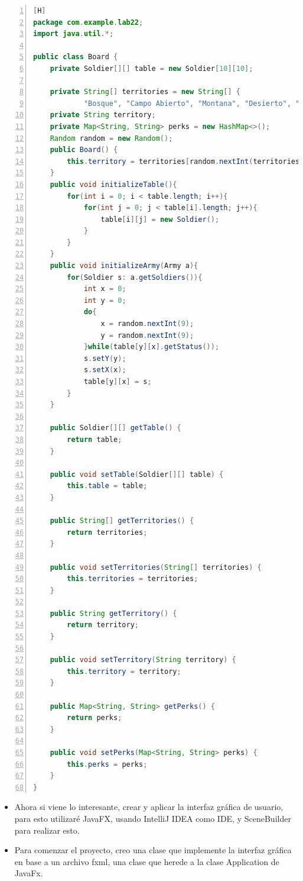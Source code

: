 \documentclass{article}
\begin{document}
	\begin{lstlisting}[language=java,caption={Clase Board}, numbers=left][H]
package com.example.lab22;
import java.util.*;

public class Board {
    private Soldier[][] table = new Soldier[10][10];

    private String[] territories = new String[] {
            "Bosque", "Campo Abierto", "Montana", "Desierto", "Playa" };
    private String territory;
    private Map<String, String> perks = new HashMap<>();
    Random random = new Random();
    public Board() {
        this.territory = territories[random.nextInt(territories.length)];
    }
    public void initializeTable(){
        for(int i = 0; i < table.length; i++){
            for(int j = 0; j < table[i].length; j++){
                table[i][j] = new Soldier();
            }
        }
    }
    public void initializeArmy(Army a){
        for(Soldier s: a.getSoldiers()){
            int x = 0;
            int y = 0;
            do{
                x = random.nextInt(9);
                y = random.nextInt(9);
            }while(table[y][x].getStatus());
            s.setY(y);
            s.setX(x);
            table[y][x] = s;
        }
    }

    public Soldier[][] getTable() {
        return table;
    }

    public void setTable(Soldier[][] table) {
        this.table = table;
    }

    public String[] getTerritories() {
        return territories;
    }

    public void setTerritories(String[] territories) {
        this.territories = territories;
    }

    public String getTerritory() {
        return territory;
    }

    public void setTerritory(String territory) {
        this.territory = territory;
    }

    public Map<String, String> getPerks() {
        return perks;
    }

    public void setPerks(Map<String, String> perks) {
        this.perks = perks;
    }
}

	\end{lstlisting}
	\begin{itemize}
		\item Ahora si viene lo interesante, crear y aplicar la interfaz gráfica de usuario, para esto utilizaré JavaFX, usando IntelliJ IDEA como IDE, y SceneBuilder para realizar esto.
		\item Para comenzar el proyecto, creo una clase que implemente la interfaz gráfica en base a un archivo fxml, una clase que herede a la clase Application de JavaFx.
	\end{itemize}
\end{document}
